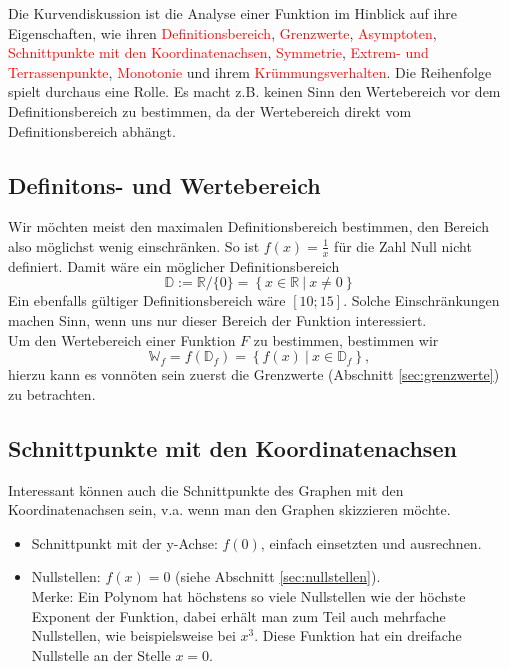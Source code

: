 Die Kurvendiskussion ist die Analyse einer Funktion im Hinblick auf ihre Eigenschaften, wie ihren \textcolor{red}{Definitionsbereich}, \textcolor{red}{Grenzwerte}, \textcolor{red}{Asymptoten}, \textcolor{red}{Schnittpunkte mit den Koordinatenachsen}, \textcolor{red}{Symmetrie}, \textcolor{red}{Extrem- und Terrassenpunkte}, \textcolor{red}{Monotonie} und ihrem \textcolor{red}{Krümmungsverhalten}. Die Reihenfolge spielt durchaus eine Rolle. Es macht z.B. keinen Sinn den Wertebereich vor dem Definitionsbereich zu bestimmen, da der Wertebereich direkt vom Definitionsbereich abhängt.

\subsection{Definitons- und Wertebereich}
Wir möchten meist den maximalen Definitionsbereich bestimmen, den Bereich also möglichst wenig einschränken. So ist $f(x) = \frac{1}{x}$ für die Zahl Null nicht definiert. Damit wäre ein möglicher Definitionsbereich 
\begin{equation*}
\mathbb{D} := \mathbb{R}/\{0\} = \left\{x \in \mathbb{R} \ | \ x \neq 0 \right\}
\end{equation*}
Ein ebenfalls gültiger Definitionsbereich wäre $\left[10;15\right]$. Solche Einschränkungen machen Sinn, wenn uns nur dieser Bereich der Funktion interessiert.\\
Um den Wertebereich einer Funktion $F$ zu bestimmen, bestimmen wir
\begin{equation*}
\mathbb{W}_f = f(\mathbb{D}_f) = \left\{f(x) \ | \ x \in \mathbb{D}_f \right\},
\end{equation*}
hierzu kann es vonnöten sein zuerst die Grenzwerte (Abschnitt \ref{sec:grenzwerte}) zu betrachten.

\subsection{Schnittpunkte mit den Koordinatenachsen}
Interessant können auch die Schnittpunkte des Graphen mit den Koordinatenachsen sein, v.a. wenn man den Graphen skizzieren möchte.
\begin{itemize}
\item Schnittpunkt mit der y-Achse: $f(0)$, einfach einsetzten und ausrechnen.
\item Nullstellen: $f(x) = 0$ (siehe Abschnitt \ref{sec:nullstellen}).\\
Merke: Ein Polynom hat höchstens so viele Nullstellen wie der höchste Exponent der Funktion, dabei erhält man zum Teil auch mehrfache Nullstellen, wie beispielsweise bei $x^3$. Diese Funktion hat ein dreifache Nullstelle an der Stelle $x=0$.
\end{itemize}


